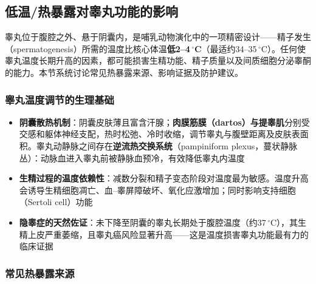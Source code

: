 \begin{enumerate}
\subsection{低温/热暴露对睾丸功能的影响}
\label{subsec:testicular_temperature}

睾丸位于腹腔之外、悬于阴囊内，是哺乳动物演化中的一项精密设计——精子发生（spermatogenesis）所需的温度比核心体温\textbf{低2--4\,$^\circ$C}（最适约34--35\,$^\circ$C）。任何使睾丸温度长期升高的因素，都可能损害生精功能、精子质量以及间质细胞分泌睾酮的能力。本节系统讨论常见热暴露来源、影响证据及防护建议。

\subsubsection{睾丸温度调节的生理基础}

\begin{itemize}[leftmargin=2cm]
	\item \textbf{阴囊散热机制}：阴囊皮肤薄且富含汗腺；\textbf{肉膜筋膜（dartos）与提睾肌}分别受交感和躯体神经支配，热时松弛、冷时收缩，调节睾丸与腹壁距离及皮肤表面积。睾丸动静脉之间存在\textbf{逆流热交换系统}（pampiniform plexus，蔓状静脉丛）：动脉血进入睾丸前被静脉血预冷，有效降低睾丸内温度
	\item \textbf{生精过程的温度依赖性}：减数分裂和精子变态阶段对温度最为敏感。温度升高会诱导生精细胞凋亡、血--睾屏障破坏、氧化应激增加；同时影响支持细胞（Sertoli cell）功能
	\item \textbf{隐睾症的天然佐证}：未下降至阴囊的睾丸长期处于腹腔温度（约37\,$^\circ$C），其生精上皮严重萎缩，且睾丸癌风险显著升高——这是温度损害睾丸功能最有力的临床证据
\end{itemize}

\subsubsection{常见热暴露来源}


\end{enumerate}

